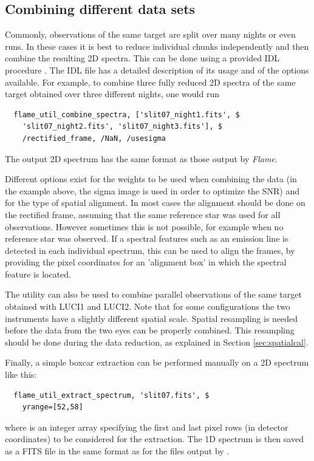 \documentclass[a4paper]{article}
\newcommand{\flame}{\emph{Flame}}
\begin{document}
\begin{sloppypar}
\subsection{Combining different data sets}

Commonly, observations of the same target are split over many nights or even runs. In these cases it is best to reduce individual chunks independently and then combine the resulting 2D spectra. This can be done using a provided IDL procedure . The IDL file has a detailed description of its usage and of the options available. For example, to combine three fully reduced 2D spectra of the same target obtained over three different nights, one would run
\begin{lstlisting}
  flame_util_combine_spectra, ['slit07_night1.fits', $
    'slit07_night2.fits', 'slit07_night3.fits'], $
    /rectified_frame, /NaN, /usesigma
\end{lstlisting}
The output 2D spectrum has the same format as those output by \flame.

Different options exist for the weights to be used when combining the data (in the example above, the sigma image is used in order to optimize the SNR) and for the type of spatial alignment. In most cases the alignment should be done on the rectified frame, assuming that the same reference star was used for all observations. However sometimes this is not possible, for example when no reference star was observed. If a spectral features such as an emission line is detected in each individual spectrum, this can be used to align the frames, by providing the pixel coordinates for an 'alignment box' in which the spectral feature is located.

The utility  can also be used to combine parallel observations of the same target obtained with LUCI1 and LUCI2. Note that for some configurations the two instruments have a slightly different spatial scale. Spatial resampling is needed before the data from the two eyes can be properly combined. This resampling should be done during the data reduction, as explained in Section \ref{sec:spatialcal}.

Finally, a simple boxcar extraction can be performed manually on a 2D spectrum like this:
\begin{lstlisting}
  flame_util_extract_spectrum, 'slit07.fits', $
    yrange=[52,58]
\end{lstlisting}
where  is an integer array specifying the first and last pixel rows (in detector coordinates) to be considered for the extraction. The 1D spectrum is then saved as a FITS file in the same format as for the files output by .





\end{sloppypar}
\end{document}
